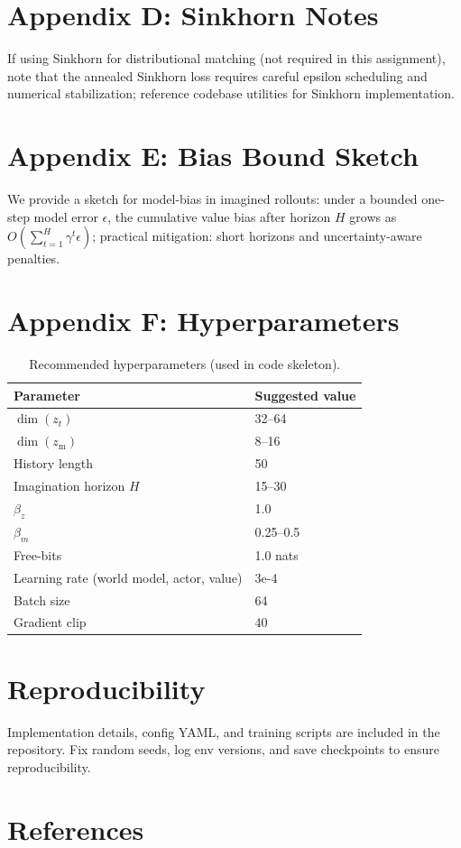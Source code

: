 \documentclass{article}
\begin{document}
\section{Appendix D: Sinkhorn Notes}
If using Sinkhorn for distributional matching (not required in this assignment), note that the annealed Sinkhorn loss requires careful epsilon scheduling and numerical stabilization; reference codebase utilities for Sinkhorn implementation.

\section{Appendix E: Bias Bound Sketch}
We provide a sketch for model-bias in imagined rollouts: under a bounded one-step model error $\epsilon$, the cumulative value bias after horizon $H$ grows as $O(\sum_{t=1}^H \gamma^t \epsilon)$; practical mitigation: short horizons and uncertainty-aware penalties.

\section{Appendix F: Hyperparameters}
\begin{table}[h]
\centering
\begin{tabular}{ll}
\toprule
Parameter & Suggested value \\
\midrule
$\dim(z_t)$ & 32--64 \\
$\dim(z_{\mathrm{m}})$ & 8--16 \\
History length & 50 \\
Imagination horizon $H$ & 15--30 \\
$\beta_z$ & 1.0 \\
$\beta_m$ & 0.25--0.5 \\
Free-bits & 1.0 nats \\
Learning rate (world model, actor, value) & 3e-4 \\
Batch size & 64 \\
Gradient clip & 40 \\
\bottomrule
\end{tabular}
\caption{Recommended hyperparameters (used in code skeleton).}
\end{table}

\section{Reproducibility}
Implementation details, config YAML, and training scripts are included in the repository. Fix random seeds, log env versions, and save checkpoints to ensure reproducibility.

\section{References}



\end{document}
